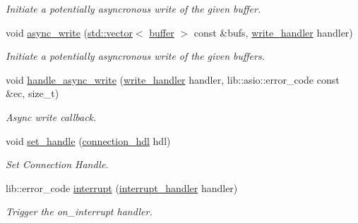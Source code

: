 \begin{DoxyCompactItemize}
\begin{DoxyCompactList}\small\item\em Initiate a potentially asyncronous write of the given buffer. \end{DoxyCompactList}\item 
\mbox{\label{classwebsocketpp_1_1transport_1_1asio_1_1connection_a9f62627d2a0fd05278a0fb1d8761911b}} 
void \mbox{\hyperlink{classwebsocketpp_1_1transport_1_1asio_1_1connection_a9f62627d2a0fd05278a0fb1d8761911b}{async\+\_\+write}} (\mbox{\hyperlink{classstd_1_1vector}{std\+::vector}}$<$ \mbox{\hyperlink{structwebsocketpp_1_1transport_1_1buffer}{buffer}} $>$ const \&bufs, \mbox{\hyperlink{namespacewebsocketpp_1_1transport_addf5d728159e7aa2bce2a0df947b1560}{write\+\_\+handler}} handler)
\begin{DoxyCompactList}\small\item\em Initiate a potentially asyncronous write of the given buffers. \end{DoxyCompactList}\item 
void \mbox{\hyperlink{classwebsocketpp_1_1transport_1_1asio_1_1connection_a5f0bb67448323c4653f564397dcb0fe8}{handle\+\_\+async\+\_\+write}} (\mbox{\hyperlink{namespacewebsocketpp_1_1transport_addf5d728159e7aa2bce2a0df947b1560}{write\+\_\+handler}} handler, lib\+::asio\+::error\+\_\+code const \&ec, size\+\_\+t)
\begin{DoxyCompactList}\small\item\em Async write callback. \end{DoxyCompactList}\item 
void \mbox{\hyperlink{classwebsocketpp_1_1transport_1_1asio_1_1connection_ac6dae6a18678187b7da35f5b064c9ddd}{set\+\_\+handle}} (\mbox{\hyperlink{namespacewebsocketpp_a6b3d26a10ee7229b84b776786332631d}{connection\+\_\+hdl}} hdl)
\begin{DoxyCompactList}\small\item\em Set Connection Handle. \end{DoxyCompactList}\item 
lib\+::error\+\_\+code \mbox{\hyperlink{classwebsocketpp_1_1transport_1_1asio_1_1connection_a2fc9b41450047e40a3b5476c0e3bf853}{interrupt}} (\mbox{\hyperlink{namespacewebsocketpp_1_1transport_a8090563b066d7e8e31f7165be18dee51}{interrupt\+\_\+handler}} handler)
\begin{DoxyCompactList}\small\item\em Trigger the on\+\_\+interrupt handler. \end{DoxyCompactList}\item 

\end{DoxyCompactItemize}

